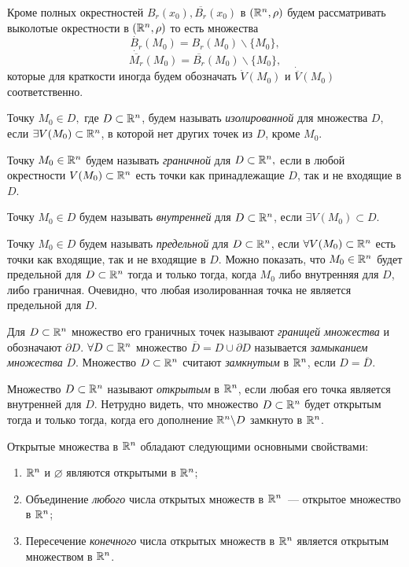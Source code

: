 \documentclass[../../main.tex]{subfiles}
\begin{document}
  \begin{rem}
    Кроме полных окрестностей $B_r(x_0), \overline{B_r}(x_0)$ в $
    (\mathbb{R}^n, \rho)$ будем рассматривать выколотые окрестности в $
    (\mathbb{R}^n, \rho)$ то есть множества
    \[
      \dot{B_r}(M_0) = B_r(M_0) \backslash \{M_0\},
    \]
    \[
      \dot{\overline{M_r}}(M_0) = \overline{B_r}(M_0) \backslash \{M_0\},
    \]
    которые для краткости иногда будем обозначать $\dot{V}(M_0) $ и 
    $\dot{\overline{V}}(M_0)$ соответственно. 
  \end{rem}
  \smallskip
  
  Точку $M_0 \in D,$ где $D \subset \mathbb{R}^n$, будем называть 
  \emph{изолированной} для множества $D$, если $\exists V(M_0) \subset 
  \mathbb{R}^n$, в которой нет других точек из $D$, кроме $M_0$.
  
  Точку $M_0 \in \mathbb{R}^n$ будем называть \emph{граничной} для $D \subset \mathbb{R}^n,
  $ если в любой окрестности $V(M_0) \subset \mathbb{R}^n$ есть точки как 
  принадлежащие $D$, так и не входящие в $D$.
  
  Точку $M_0 \in D$ будем называть \emph{внутренней} для $D \subset \mathbb{R}^n$, 
  если $\exists V(M_0) \subset D$.
  
  Точку $M_0 \in D$ будем называть \emph{предельной} для $D \subset \mathbb{R}^n$, 
  если $\forall V(M_0) \subset \mathbb{R}^n$ есть точки как входящие, так и 
  не входящие в $D$.
  Можно показать, что $M_0 \in \mathbb{R}^n$ будет предельной для $D \subset 
  \mathbb{R}^n$ тогда и только тогда, когда $M_0$ либо внутренняя для $D$, 
  либо граничная.
  Очевидно, что любая изолированная точка не является предельной для 
  $D$.
  
  Для $D \subset \mathbb{R}^n$ множество его граничных точек называют 
  \emph{границей множества} и обозначают $\partial D$. 
  $\forall D \subset \mathbb{R}^n$ множество $\overline D = D \cup \partial D$ 
  называется \emph{замыканием множества} $D$. 
  Множество $D \subset \mathbb{R}^n$ считают \emph{замкнутым} в $\mathbb{R}^n$, если
  $D = \overline D$.
  
  Множество $D \subset \mathbb{R}^n$ называют \emph{открытым} в $\mathbb{R}^n$, если любая 
  его точка является внутренней для $D$. Нетрудно видеть, что 
  множество $D \subset \mathbb{R}^n$ будет открытым тогда и только тогда, 
  когда его дополнение $\mathbb{R}^n \backslash D$ замкнуто в $\mathbb{R}^n$. 
  
  \smallskip
  Открытые множества в $\mathbb{R}^n$ обладают следующими основными 
  свойствами:
  \begin{enumerate}
    \item
     $\mathbb{R}^n$  и $\varnothing$ являются открытыми в $\mathbb{R}^n$; 
     \item
      Объединение \emph{любого} числа открытых множеств в $\mathbb{R}^n$~--- 
      открытое множество в $\mathbb{R}^n$; 
      \item Пересечение \emph{конечного} числа открытых множеств в 
      $\mathbb{R}^n$ является открытым множеством в $\mathbb{R}^n$.
  \end{enumerate}  
\end{document}
